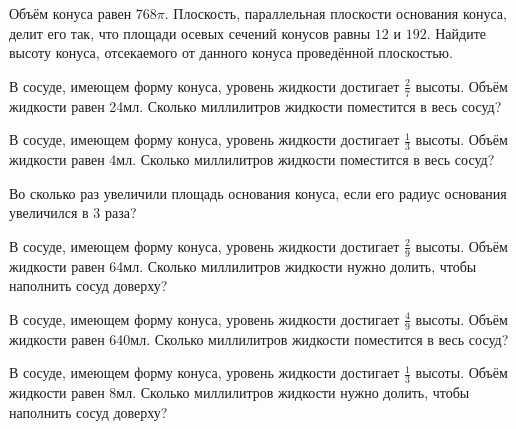 \documentclass[a4paper]{article}
\begin{document}
\begin{taskBN}{23}
Объём конуса равен $768\pi$. Плоскость, параллельная плоскости основания конуса,  делит его так, что площади осевых сечений конусов равны $12$ и $192$. Найдите высоту конуса, отсекаемого от данного конуса проведённой плоскостью. 
\end{taskBN}

\begin{taskBN}{24}
В сосуде, имеющем форму конуса, уровень жидкости достигает $\frac{2}{7}$ высоты. Объём жидкости равен 24мл. Сколько миллилитров жидкости поместится в весь сосуд?
\end{taskBN}

\begin{taskBN}{25}
В сосуде, имеющем форму конуса, уровень жидкости достигает $\frac{1}{3}$ высоты. Объём жидкости равен 4мл. Сколько миллилитров жидкости поместится в весь сосуд?
\end{taskBN}

\begin{taskBN}{26}
Во сколько раз увеличили площадь основания конуса, если его радиус основания увеличился в 3 раза?
\end{taskBN}

\begin{taskBN}{27}
В сосуде, имеющем форму конуса, уровень жидкости достигает $\frac{2}{9}$ высоты. Объём жидкости равен 64мл. Сколько миллилитров жидкости нужно долить, чтобы наполнить сосуд доверху?
\end{taskBN}

\begin{taskBN}{28}
В сосуде, имеющем форму конуса, уровень жидкости достигает $\frac{4}{9}$ высоты. Объём жидкости равен 640мл. Сколько миллилитров жидкости поместится в весь сосуд?
\end{taskBN}

\begin{taskBN}{29}
В сосуде, имеющем форму конуса, уровень жидкости достигает $\frac{1}{3}$ высоты. Объём жидкости равен 8мл. Сколько миллилитров жидкости нужно долить, чтобы наполнить сосуд доверху?
\end{taskBN}
\end{document}
